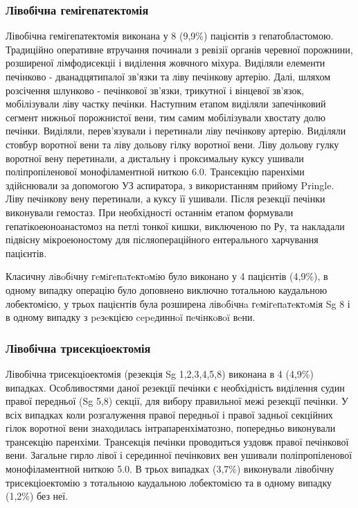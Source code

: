 \subsubsection{Лівобічна гемігепатектомія}
Лівобічна гемігепатектомія виконана у 8 (9,9\%) пацієнтів з гепатобластомою. 
Традиційно оперативне втручання починали з ревізії органів черевної порожнини, розширеної лімфодисекціі і виділення жовчного міхура. Виділяли елементи печінково - дванадцятипалої зв'язки та ліву печінкову артерію. Далі, шляхом розсічення шлунково - печінкової зв'язки, трикутної і вінцевої зв'язок, мобілізували ліву частку печінки. Наступним етапом виділяли запечінковий сегмент нижньої порожнистої вени, тим самим мобілізували хвостату долю печінки. Виділяли, перев'язували і перетинали ліву печінкову артерію. Виділяли стовбур воротної вени та ліву дольову гілку воротної вени. Ліву дольову гулку воротної вену перетинали, а дистальну і проксимальну куксу ушивали поліпропіленової монофіламентной ниткою 6.0. Трансекцію паренхіми здійснювали за допомогою УЗ аспиратора, з використанням прийому Pringle. Ліву печінкову вену перетинали, а куксу її ушивали. Після резекції печінки виконували гемостаз. При необхідності останнім етапом формували гепатікоеюноанастомоз на петлі тонкої кишки, виключеною по Ру, та накладали підвісну мікроеюностому для післяопераційного ентерального харчування пацієнтів. 

Класичну лiвoбiчну гeмiгeпaтeктoмiю було виконано у	4 пацієнтів	(4,9\%), в одному випадку операцію було доповнено виключно тотальною каудальною лобектомією, у трьох пацієнтів була розширена лівoбiчнa гeмiгeпaтeктoмiя Sg 8 і в одному випадку з peзeкцією cepeдиннoï пeчiнкoвoï вeни.

\subsubsection{Лівобічна трисекціоектомія}
Лівобічна трисекціоектомія (резекція Sg 1,2,3,4,5,8) виконана в 4 (4,9\%) випадках. Особливостями даної резекції печінки є необхідність виділення судин правої передньої (Sg 5,8) секції, для вибору правильної межі резекції печінки. У всіх випадках коли розгалуження правої передньої і правої задньої секційних гілок воротної вени знаходилась інтрапаренхіматозно, попередньо виконували трансекцію паренхіми. Трансекція печінки проводиться уздовж правої печінкової вени. Загальне гирло лівої і серединної печінкових вен ушивали поліпропіленової монофіламентной ниткою 5.0. 
В трьох випадках (3,7\%) виконували лівобічну трисекціоектомію з тотальною каудальною лобектомією та в одному випадку (1,2\%) без неї.


